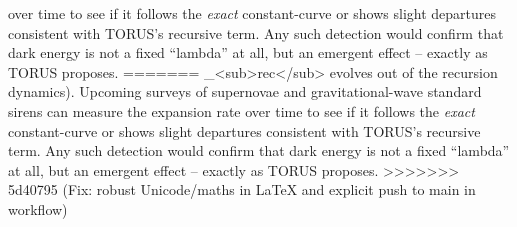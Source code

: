 \documentclass[]{article}
\begin{document}
over time to see if it follows the \emph{exact} constant-\Lambda curve or
shows slight departures consistent with TORUS's recursive
term\hspace{0pt}. Any such detection would confirm that dark energy is
not a fixed ``lambda'' at all, but an emergent effect -- exactly as
TORUS proposes.
=======
\Lambda\_\textless{}sub\textgreater{}rec\textless{}/sub\textgreater{} evolves
out of the recursion dynamics)​. Upcoming surveys of supernovae and
gravitational-wave standard sirens can measure the expansion rate over
time to see if it follows the \emph{exact} constant-\Lambda curve or shows
slight departures consistent with TORUS's recursive term​. Any such
detection would confirm that dark energy is not a fixed ``lambda'' at
all, but an emergent effect -- exactly as TORUS proposes.
>>>>>>> 5d40795 (Fix: robust Unicode/maths in LaTeX and explicit push to main in workflow)
\end{document}
